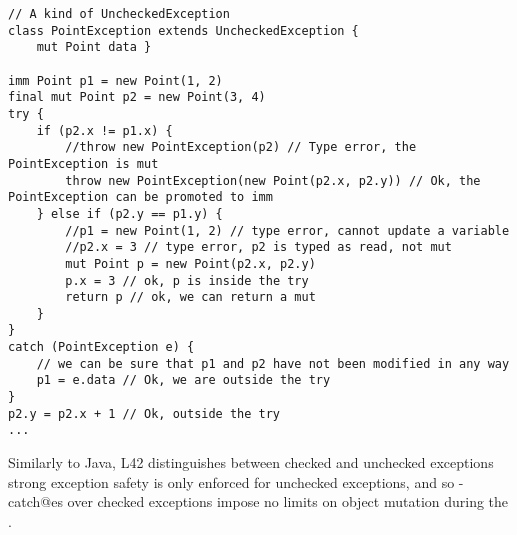 \begin{lstlisting}
// A kind of UncheckedException
class PointException extends UncheckedException {
	mut Point data }

imm Point p1 = new Point(1, 2)
final mut Point p2 = new Point(3, 4)
try {
	if (p2.x != p1.x) {
		//throw new PointException(p2) // Type error, the PointException is mut
		throw new PointException(new Point(p2.x, p2.y)) // Ok, the PointException can be promoted to imm
	} else if (p2.y == p1.y) {
		//p1 = new Point(1, 2) // type error, cannot update a variable
		//p2.x = 3 // type error, p2 is typed as read, not mut
		mut Point p = new Point(p2.x, p2.y)
		p.x = 3 // ok, p is inside the try
		return p // ok, we can return a mut
	}
}
catch (PointException e) {
	// we can be sure that p1 and p2 have not been modified in any way
	p1 = e.data // Ok, we are outside the try
}
p2.y = p2.x + 1 // Ok, outside the try
...
\end{lstlisting}

Similarly to Java, L42 distinguishes between checked and unchecked exceptions\IO[2.3]{,} strong exception safety is only enforced for unchecked exceptions, and so
\Q@try-catch@es over checked exceptions impose no limits on object mutation during the \Q@try@.







% 

